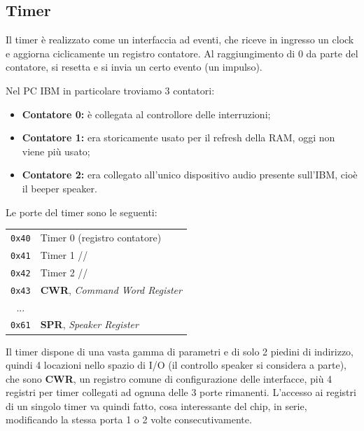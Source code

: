 \documentclass[a4paper,11pt]{article}
\begin{document}
\lstset{style=codestyle, language=c++}


\subsection{Timer}
Il timer è realizzato come un interfaccia ad eventi, che riceve in ingresso un clock e aggiorna ciclicamente un registro contatore.
Al raggiungimento di 0 da parte del contatore, si resetta e si invia un certo evento (un impulso).

Nel PC IBM in particolare troviamo 3 contatori:
\begin{itemize}
	\item \textbf{Contatore 0:} è collegata al controllore delle interruzioni;
	\item \textbf{Contatore 1:} era storicamente usato per il refresh della RAM, oggi non viene più usato;
	\item \textbf{Contatore 2:} era collegato all'unico dispositivo audio presente sull'IBM, cioè il beeper speaker.
\end{itemize}

Le porte del timer sono le seguenti:
\begin{table}[h!]
	\center
	\begin{tabular} { c | p{7cm} }
		\lstinline|0x40| & Timer 0 (registro contatore) \\
		\lstinline|0x41| & Timer 1 \hspace{1.2cm} // \\
		\lstinline|0x42| & Timer 2 \hspace{1.2cm} // \\
		\lstinline|0x43| & \textbf{CWR}, \textit{Command Word Register} \\
		\hline
		... & \\
		\hline
		\lstinline|0x61| & \textbf{SPR}, \textit{Speaker Register} \\
	\end{tabular}
\end{table}

Il timer dispone di una vasta gamma di parametri e di solo 2 piedini di indirizzo, quindi 4 locazioni nello spazio di I/O (il controllo speaker si considera a parte), che sono \textbf{CWR}, un registro comune di configurazione delle interfacce, più 4 registri per timer collegati ad ognuna delle 3 porte rimanenti.
L'accesso ai registri di un singolo timer va quindi fatto, cosa interessante del chip, in serie, modificando la stessa porta 1 o 2 volte consecutivamente.
\end{document}
